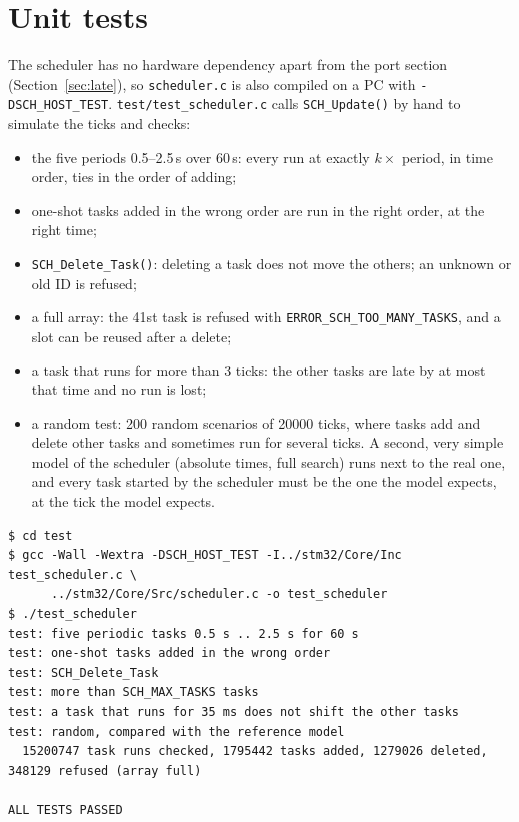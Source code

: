 \documentclass[12pt,a4paper]{article}
\numberwithin{figure}{section}
\numberwithin{table}{section}
\newcommand{\code}[1]{\texttt{#1}}
\begin{document}
\section{Unit tests}
\label{sec:test}
The scheduler has no hardware dependency apart from the port section (Section~\ref{sec:late}), so \code{scheduler.c} is also compiled on a PC with \code{-DSCH\_HOST\_TEST}. \code{test/test\_scheduler.c} calls \code{SCH\_Update()} by hand to simulate the ticks and checks:
\begin{itemize}[leftmargin=1.4em,itemsep=1pt]
\item the five periods 0.5--2.5\,s over 60\,s: every run at exactly $k \times$ period, in time order, ties in the order of adding;
\item one-shot tasks added in the wrong order are run in the right order, at the right time;
\item \code{SCH\_Delete\_Task()}: deleting a task does not move the others; an unknown or old ID is refused;
\item a full array: the 41st task is refused with \code{ERROR\_SCH\_TOO\_MANY\_TASKS}, and a slot can be reused after a delete;
\item a task that runs for more than 3 ticks: the other tasks are late by at most that time and no run is lost;
\item a random test: 200 random scenarios of 20000 ticks, where tasks add and delete other tasks and sometimes run for several ticks. A second, very simple model of the scheduler (absolute times, full search) runs next to the real one, and every task started by the scheduler must be the one the model expects, at the tick the model expects.
\end{itemize}

\begin{lstlisting}[style=term, caption={Building and running the unit tests}]
$ cd test
$ gcc -Wall -Wextra -DSCH_HOST_TEST -I../stm32/Core/Inc test_scheduler.c \
      ../stm32/Core/Src/scheduler.c -o test_scheduler
$ ./test_scheduler
test: five periodic tasks 0.5 s .. 2.5 s for 60 s
test: one-shot tasks added in the wrong order
test: SCH_Delete_Task
test: more than SCH_MAX_TASKS tasks
test: a task that runs for 35 ms does not shift the other tasks
test: random, compared with the reference model
  15200747 task runs checked, 1795442 tasks added, 1279026 deleted, 348129 refused (array full)

ALL TESTS PASSED
\end{lstlisting}
\end{document}

